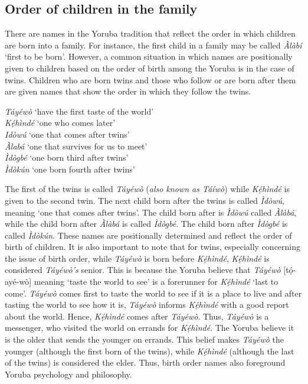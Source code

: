 \documentclass[output=paper,colorlinks,citecolor=brown]{langscibook}
\begin{document}
\subsection{Order of children in the family}

There are names in the Yoruba tradition that reflect the order in which children are born into a family. For instance, the first child in a family may be called \textit{Àlàbí} ‘first to be born’. However, a common situation in which names are positionally given to children based on the order of birth among the Yoruba is in the case of twins. Children who are born twins and those who follow or are born after them are given names that show the order in which they follow the twins. 

\ea \label{Order1}
\begin{xlist}
\ex	\textit{Táyéwò}		‘have the first taste of the world’\\
\ex		\textit{Kẹ́hìndé}	‘one who comes later’\\
\ex		\textit{Idòwú}		‘one that comes after twins’\\
\ex		\textit{Àlabá} 		‘one that survives for us to meet’\\
\ex		\textit{Ìdògbé}		‘one born third after twins’ \\
\ex  \textit{Ìdòkún}   `one born fourth after twins'
\end{xlist}
\z

The first of the twins is called \textit{Táyéwò} (\textit{also known as Táíwò}) while \textit{Kẹ́hìndé} is given to the second twin. The next child born after the twins is called \textit{Ìdòwú}, meaning ‘one that comes after twins'. The child born after is \textit{Ìdòwú} called \textit{Àlàbá}, while the child born after \textit{Àlàbá} is called \textit{Ìdògbé}. The child born after \textit{Ìdògbé} is called \textit{Ìdòkún}. These names are positionally determined and reflect the order of birth of children. It is also important to note that for twins, especially concerning the issue of birth order, while \textit{Táyéwò} is born before \textit{Kẹ́hìndé}, \textit{Kẹ́hìndé} is considered \textit{Táyéwò's} senior. This is because the Yoruba believe that \textit{Táyéwò} [tọ́-ayé-wò] meaning ‘taste the world to see' is a forerunner for \textit{Kẹ́hìndé} `last to come'. \textit{Táyéwò} comes first to taste the world to see if it is a place to live and after tasting the world to see how it is, \textit{Táyéwò} informs \textit{Kẹ́hìndé} with a good report about the world. Hence, \textit{Kẹ́hìndé} comes after \textit{Táyéwò}. Thus, \textit{Táyéwò} is a messenger, who visited the world on errands for \textit{Kẹ́hìndé}. The Yoruba believe it is the older that sends the younger on errands. This belief makes \textit{Táyéwò} the younger (although the first born of the twins), while \textit{Kẹ́hìndé} (although the last of the twins) is considered the elder. Thus, birth order names also foreground Yoruba psychology and philosophy.
\end{document}
